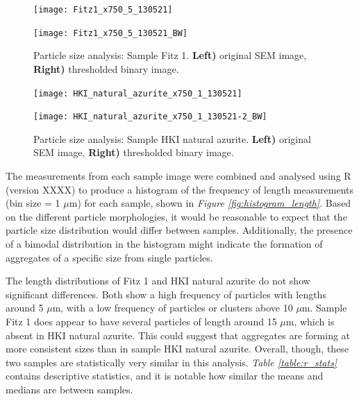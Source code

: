 \begin{figure}[H]
\centering
\begin{minipage}{.45\textwidth}
  \centering
  \texttt{[image: Fitz1\_x750\_5\_130521]}
\end{minipage}
\begin{minipage}{.45\textwidth}
  \centering
  \texttt{[image: Fitz1\_x750\_5\_130521\_BW]}
\end{minipage}
\caption[Particle size analysis: Sample Fitz 1]{Particle size analysis: Sample Fitz 1. \textbf{Left)} original SEM image, \textbf{Right)} thresholded binary image.}
\label{fig:imageJ_fitz1}
\end{figure}

\begin{figure}[H]
\centering
\begin{minipage}{.45\textwidth}
  \centering
  \texttt{[image: HKI\_natural\_azurite\_x750\_1\_130521]}
\end{minipage}
\begin{minipage}{.45\textwidth}
  \centering
  \texttt{[image: HKI\_natural\_azurite\_x750\_1\_130521-2\_BW]}
\end{minipage}
\caption[Particle size analysis: Sample HKI natural azurite]{Particle size analysis: Sample HKI natural azurite. \textbf{Left)} original SEM image, \textbf{Right)} thresholded binary image.}
\label{fig:imageJ_hki}
\end{figure}

The measurements from each sample image were combined and analysed using R (version XXXX) to produce a histogram of the frequency of length measurements (bin size = 1 $\mu$m) for each sample, shown in \textit{Figure \ref{fig:histogram_length}}. Based on the different particle morphologies, it would be reasonable to expect that the particle size distribution would differ between samples. Additionally, the presence of a bimodal distribution in the histogram might indicate the formation of aggregates of a specific size from single particles. 

The length distributions of Fitz 1 and HKI natural azurite do not show significant differences. Both show a high frequency of particles with lengths around 5 $\mu$m, with a low frequency of particles or clusters above 10 $\mu$m. Sample Fitz 1 does appear to have several particles of length around 15 $\mu$m, which is absent in HKI natural azurite. This could suggest that aggregates are forming at more consistent sizes than in sample HKI natural azurite. Overall, though, these two samples are statistically very similar in this analysis. \textit{Table \ref{table:r_stats}} contains descriptive statistics, and it is notable how similar the means and medians are between samples.  

